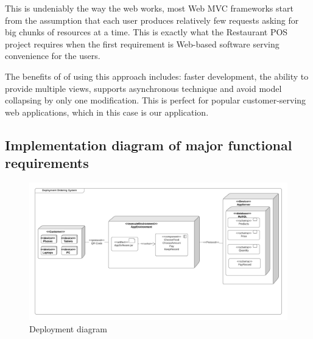 \documentclass[a4paper]{article}
\numberwithin{equation}{section}
\begin{document}
This is undeniably the way the web works, most Web MVC frameworks start from the assumption that each user produces relatively few requests asking for big chunks of resources at a time.
This is exactly what the Restaurant POS project requires when the first requirement is Web-based software serving convenience for the users.

The benefits of of using this approach includes: faster development, the ability to provide multiple views, supports asynchronous technique and avoid model collapsing by only one modification.
This is perfect for popular customer-serving web applications, which in this case is our application.

\subsection{Implementation diagram of major functional requirements}

\begin{figure}[H]
  \centering
  \includegraphics[width=\textwidth]{./assets/t3/3.2.png}
  \caption{Deployment diagram}
\end{figure}
\end{document}
